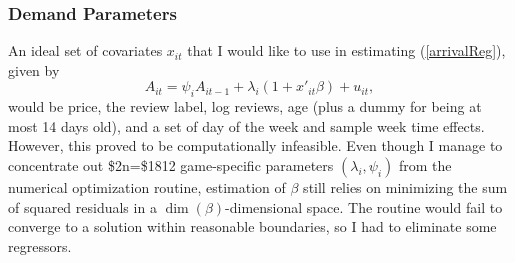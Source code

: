 \documentclass[12pt,pagebackref]{article}
\begin{document}
\hypertarget{demand-parameters-1}{%
\subsubsection{Demand Parameters}\label{demand-parameters-1}}

An ideal set of covariates \(x_{it}\) that I would like to use in
estimating (\ref{arrivalReg}), given by \[
A_{it} = \psi_i A_{it-1} + \lambda_i(1+x'_{it}\beta) + u_{it},
\] \noindent would be price, the review label, log reviews, age (plus a
dummy for being at most 14 days old), and a set of day of the week and
sample week time effects. However, this proved to be computationally
infeasible. Even though I manage to concentrate out \$2n=\$1812
game-specific parameters \((\lambda_i, \psi_i)\) from the numerical
optimization routine, estimation of \(\beta\) still relies on minimizing
the sum of squared residuals in a \(\dim(\beta)\)-dimensional space. The
routine would fail to converge to a solution within reasonable
boundaries, so I had to eliminate some regressors.
\end{document}
